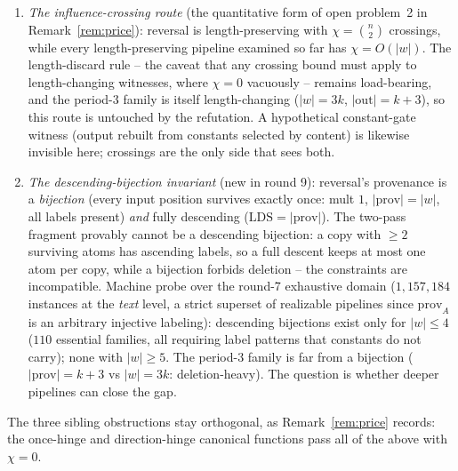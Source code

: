 \begin{enumerate}
    \item \emph{The influence-crossing route} (the quantitative form
    of open problem~2 in Remark~\ref{rem:price}): reversal is
    length-preserving with $\chi = \binom{n}{2}$ crossings, while
    every length-preserving pipeline examined so far has
    $\chi = O(|w|)$.  The length-discard rule -- the caveat that any
    crossing bound must apply to length-changing witnesses, where
    $\chi = 0$ vacuously -- remains load-bearing, and the
    period-$3$ family is itself length-changing ($|w| = 3k$,
    $|\mathrm{out}| = k+3$), so this route is untouched by the
    refutation.  A hypothetical constant-gate witness (output rebuilt
    from constants selected by content) is likewise invisible here;
    crossings are the only side that sees both.
    \item \emph{The descending-bijection invariant} (new in round 9):
    reversal's provenance is a \emph{bijection} (every input position
    survives exactly once: mult $1$, $|\mathrm{prov}| = |w|$, all
    labels present) \emph{and} fully descending ($\mathrm{LDS} =
    |\mathrm{prov}|$).  The two-pass fragment provably cannot be a
    descending bijection: a copy with $\geq 2$ surviving atoms has
    ascending labels, so a full descent keeps at most one atom per
    copy, while a bijection forbids deletion -- the constraints are
    incompatible.  Machine probe over the round-7 exhaustive domain
    ($1{,}157{,}184$ instances at the \emph{text} level, a strict
    superset of realizable pipelines since $\mathrm{prov}_A$ is an
    arbitrary injective labeling): descending bijections exist only
    for $|w| \leq 4$ ($110$ essential families, all requiring label
    patterns that constants do not carry); none with $|w| \geq 5$.
    The period-$3$ family is far from a bijection
    ($|\mathrm{prov}| = k+3$ vs $|w| = 3k$: deletion-heavy).  The
    question is whether deeper pipelines can close the gap.
\end{enumerate}

The three sibling obstructions stay orthogonal, as
Remark~\ref{rem:price} records: the once-hinge and direction-hinge
canonical functions pass all of the above with $\chi = 0$.
